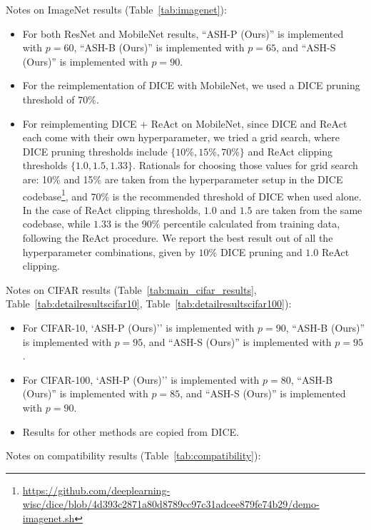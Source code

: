 \documentclass{article}
\newcommand{\tabref}[1]{Table~\ref{tab:#1}}
\begin{document}
Notes on ImageNet results (\tabref{imagenet}): 
\begin{itemize}
    \item For both ResNet and MobileNet results, ``ASH-P (Ours)'' is implemented with $p=60$, ``ASH-B (Ours)'' is implemented with $p=65$, and ``ASH-S (Ours)'' is implemented with $p=90$.  
    
    \item For the reimplementation of DICE with MobileNet, we used a DICE pruning threshold of $70\%$. 
    \item For reimplementing DICE + ReAct on MobileNet, since DICE and ReAct each come with their own hyperparameter, we tried a grid search, where DICE pruning thresholds include $\{10\%, 15\%, 70\%\}$ and ReAct clipping thresholds $\{1.0, 1.5, 1.33\}$. Rationals for choosing those values for grid search are: 10\% and 15\% are taken from the hyperparameter setup in the DICE codebase\footnote{\url{https://github.com/deeplearning-wisc/dice/blob/4d393c2871a80d8789cc97c31adcee879fe74b29/demo-imagenet.sh}}, and 70\% is the recommended threshold of DICE when used alone. In the case of ReAct clipping thresholds, $1.0$ and $1.5$ are taken from the same codebase, while $1.33$ is the 90\% percentile calculated from training data, following the ReAct procedure. We report the best result out of all the hyperparameter combinations, given by $10\%$ DICE pruning and $1.0$ ReAct clipping.
\end{itemize}

Notes on CIFAR results (\tabref{main_cifar_results}, \tabref{detailresultscifar10}, \tabref{detailresultscifar100}):
\begin{itemize}
    \item For CIFAR-10, `ASH-P (Ours)'' is implemented with $p=90$, ``ASH-B (Ours)'' is implemented with $p=95$, and ``ASH-S (Ours)'' is implemented with $p=95$. \item For CIFAR-100, `ASH-P (Ours)'' is implemented with $p=80$, ``ASH-B (Ours)'' is implemented with $p=85$, and ``ASH-S (Ours)'' is implemented with $p=90$.
    \item Results for other methods are copied from DICE.
\end{itemize}

Notes on compatibility results (\tabref{compatibility}):
\end{document}
